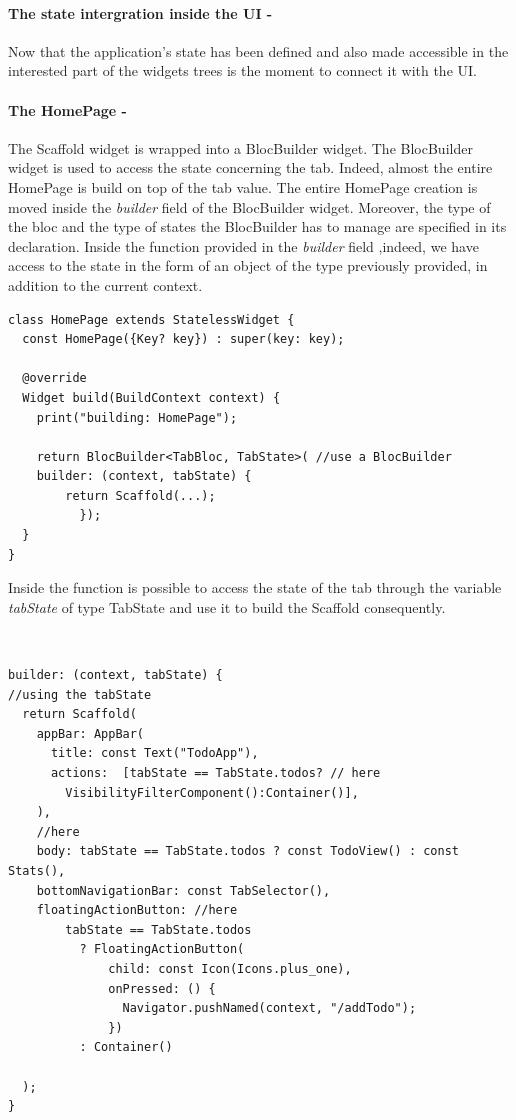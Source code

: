 \paragraph{The state intergration inside the UI - }
\label{subpar:todo_app_bloc_core_state}
Now that the application's state has been defined and also made accessible in the interested part of the widgets trees is the moment to connect it with the UI.

\paragraph{The HomePage - }
\label{subpar:todo_app_bloc_core_state}

The Scaffold widget is wrapped into a BlocBuilder widget. The BlocBuilder widget is used to access the state concerning the tab. Indeed, almost the entire HomePage is build on top of the tab value. The entire HomePage creation is moved inside the \textit{builder} field of the BlocBuilder widget. Moreover, the type of the bloc and the type of states the BlocBuilder has to manage are specified in its declaration. Inside the function provided in the \textit{builder} field ,indeed, we have access to the state in the form of an object of the type previously provided, in addition to the current context.
\begin{code}
\mbox{}
 \mbox{}
\label{code:2.14}
\begin{verbatim}
class HomePage extends StatelessWidget {
  const HomePage({Key? key}) : super(key: key);

  @override
  Widget build(BuildContext context) {
    print("building: HomePage");

    return BlocBuilder<TabBloc, TabState>( //use a BlocBuilder
    builder: (context, tabState) {
    	return Scaffold(...);
          });
  }
}
\end{verbatim}
\end{code}
Inside the function is possible to access the state of the tab through the variable \textit{tabState} of type TabState and use it to build the Scaffold consequently.
\begin{code}
\mbox{}\\
 \mbox{}
\label{code:2.14}
\begin{verbatim}
builder: (context, tabState) {
//using the tabState
  return Scaffold(
    appBar: AppBar(
      title: const Text("TodoApp"),
      actions:  [tabState == TabState.todos? // here
        VisibilityFilterComponent():Container()],
    ),
    //here
    body: tabState == TabState.todos ? const TodoView() : const Stats(),
    bottomNavigationBar: const TabSelector(),
    floatingActionButton: //here
        tabState == TabState.todos
          ? FloatingActionButton(
              child: const Icon(Icons.plus_one),
              onPressed: () {
                Navigator.pushNamed(context, "/addTodo");
              })
          : Container()

  );
}
\end{verbatim}
\mbox{}
\end{code}
